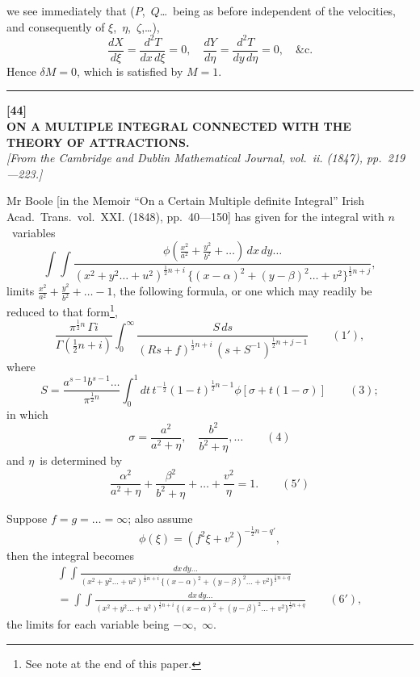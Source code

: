 \documentclass[11pt,a4paper]{article}
\begin{document}
we see immediately that ($P$,~$Q$\ldots\ being as before independent of the velocities, and consequently of $\xi$,~$\eta$,~$\zeta$,\ldots),
\[
\frac{dX}{d\xi} = \frac{d^2T}{dx\,d\xi} = 0, \quad \frac{dY}{d\eta} = \frac{d^2T}{dy\,d\eta} = 0, \quad \&\text{c.}
\]
Hence $\delta M = 0$, which is satisfied by $M = 1$.

\vspace{20pt}
\begin{center}
\rule{0.5\textwidth}{0.4pt}
\end{center}


\newpage
\begin{center}
\textbf{[44]}\\[4pt]
\textbf{\large ON A MULTIPLE INTEGRAL CONNECTED WITH THE\\THEORY OF ATTRACTIONS.}\\[4pt]
\textit{[From the Cambridge and Dublin Mathematical Journal, vol.~ii. (1847), pp.~219---223.]}
\end{center}

\vspace{6pt}

Mr Boole [in the Memoir ``On a Certain Multiple definite Integral'' Irish Acad.\ Trans.\ vol.~XXI. (1848), pp.~40---150] has given for the integral with $n$~variables
\[
\int\!\!\int \frac{\phi(\frac{x^2}{a^2} + \frac{y^2}{b^2} + \ldots)\,dx\,dy\ldots}{(x^2 + y^2\ldots + u^2)^{\frac{1}{2}n+i} \, \{(x-\alpha)^2 + (y-\beta)^2\ldots + v^2\}^{\frac{1}{2}n+j}},
\]
limits $\frac{x^2}{a^2} + \frac{y^2}{b^2} + \ldots - 1$,
the following formula, or one which may readily be reduced to that form\footnote{See note at the end of this paper.},
\[
\frac{\pi^{\frac{1}{2}n}\,\Gamma i}{\Gamma(\frac{1}{2}n+i)} \int_0^\infty \frac{S\,ds}{(Rs+f)^{\frac{1}{2}n+i} \,(s+S^{-1})^{\frac{1}{2}n+j-1}} \qquad(1'),
\]
where
\[
S = \frac{a^{s-1}b^{s-1}\ldots}{\pi^{\frac{1}{2}n}} \int_0^1 dt \, t^{-\frac{1}{2}}(1-t)^{\frac{1}{2}n-1} \phi[\sigma + t(1-\sigma)] \qquad(3);
\]
in which
\[
\sigma = \frac{a^2}{a^2+\eta}, \quad \frac{b^2}{b^2+\eta}, \ldots \qquad(4)
\]
and $\eta$~is determined by
\[
\frac{\alpha^2}{a^2+\eta} + \frac{\beta^2}{b^2+\eta} + \ldots + \frac{v^2}{\eta} = 1. \qquad(5')
\]

\vspace{10pt}

Suppose $f = g = \ldots = \infty$; also assume
\[
\phi(\xi) = (f^2\xi + v^2)^{-\frac{1}{2}n-q'},
\]
then the integral becomes
\begin{multline*}
\int\!\!\int \frac{dx\,dy\ldots}{(x^2+y^2\ldots+u^2)^{\frac{1}{2}n+i} \, \{(x-\alpha)^2 + (y-\beta)^2\ldots + v^2\}^{\frac{1}{2}n+q}} \\
= \int\!\!\int \frac{dx\,dy\ldots}{(x^2+y^2\ldots+u^2)^{\frac{1}{2}n+i} \, \{(x-\alpha)^2 + (y-\beta)^2\ldots + v^2\}^{\frac{1}{2}n+q}} \qquad(6'),
\end{multline*}
the limits for each variable being $-\infty$,~$\infty$.
\end{document}
